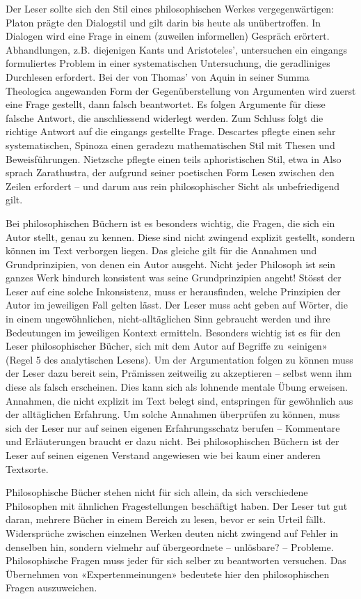 \documentclass[a4paper,11pt]{scrartcl}
\begin{document}
Der Leser sollte sich den Stil eines philosophischen Werkes vergegenwärtigen: Platon prägte den Dialogstil und gilt darin bis heute als unübertroffen. In Dialogen wird eine Frage in einem (zuweilen informellen) Gespräch erörtert. Abhandlungen, z.B. diejenigen Kants und Aristoteles', untersuchen ein eingangs formuliertes Problem in einer systematischen Untersuchung, die geradliniges Durchlesen erfordert. Bei der von Thomas' von Aquin in seiner Summa Theologica angewanden Form der Gegenüberstellung von Argumenten wird zuerst eine Frage gestellt, dann falsch beantwortet. Es folgen Argumente für diese falsche Antwort, die anschliessend widerlegt werden. Zum Schluss folgt die richtige Antwort auf die eingangs gestellte Frage. Descartes pflegte einen sehr systematischen, Spinoza einen geradezu mathematischen Stil mit Thesen und Beweisführungen. Nietzsche pflegte einen teils aphoristischen Stil, etwa in Also sprach Zarathustra, der aufgrund seiner poetischen Form Lesen zwischen den Zeilen erfordert – und darum aus rein philosophischer Sicht als unbefriedigend gilt.

Bei philosophischen Büchern ist es besonders wichtig, die Fragen, die sich ein Autor stellt, genau zu kennen. Diese sind nicht zwingend explizit gestellt, sondern können im Text verborgen liegen. Das gleiche gilt für die Annahmen und Grundprinzipien, von denen ein Autor ausgeht. Nicht jeder Philosoph ist sein ganzes Werk hindurch konsistent was seine Grundprinzipien angeht! Stösst der Leser auf eine solche Inkonsistenz, muss er herausfinden, welche Prinzipien der Autor im jeweiligen Fall gelten lässt. Der Leser muss acht geben auf Wörter, die in einem ungewöhnlichen, nicht-alltäglichen Sinn gebraucht werden und ihre Bedeutungen im jeweiligen Kontext ermitteln. Besonders wichtig ist es für den Leser philosophischer Bücher, sich mit dem Autor auf Begriffe zu «einigen» (Regel 5 des analytischen Lesens). Um der Argumentation folgen zu können muss der Leser dazu bereit sein, Prämissen zeitweilig zu akzeptieren – selbst wenn ihm diese als falsch erscheinen. Dies kann sich als lohnende mentale Übung erweisen. Annahmen, die nicht explizit im Text belegt sind, entspringen für gewöhnlich aus der alltäglichen Erfahrung. Um solche Annahmen überprüfen zu können, muss sich der Leser nur auf seinen eigenen Erfahrungsschatz berufen – Kommentare und Erläuterungen braucht er dazu nicht. Bei philosophischen Büchern ist der Leser auf seinen eigenen Verstand angewiesen wie bei kaum einer anderen Textsorte.

Philosophische Bücher stehen nicht für sich allein, da sich verschiedene Philosophen mit ähnlichen Fragestellungen beschäftigt haben. Der Leser tut gut daran, mehrere Bücher in einem Bereich zu lesen, bevor er sein Urteil fällt. Widersprüche zwischen einzelnen Werken deuten nicht zwingend auf Fehler in denselben hin, sondern vielmehr auf übergeordnete – unlösbare? – Probleme. Philosophische Fragen muss jeder für sich selber zu beantworten versuchen. Das Übernehmen von «Expertenmeinungen» bedeutete hier den philosophischen Fragen auszuweichen.
\end{document}
